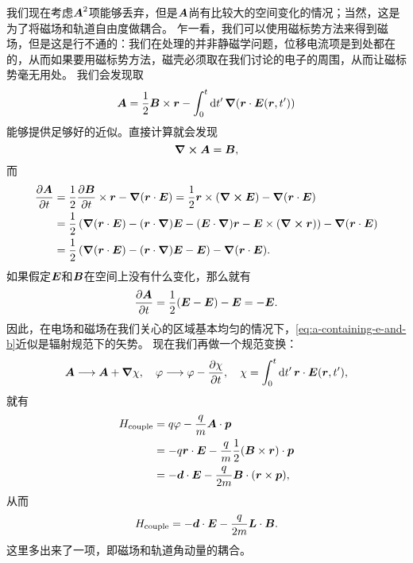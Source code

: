 我们现在考虑$\vb*{A}^2$项能够丢弃，但是$\vb*{A}$尚有比较大的空间变化的情况；当然，这是为了将磁场和轨道自由度做耦合。
乍一看，我们可以使用磁标势方法来得到磁场，但是这是行不通的：我们在处理的并非静磁学问题，位移电流项是到处都在的，从而如果要用磁标势方法，磁壳必须取在我们讨论的电子的周围，从而让磁标势毫无用处。
我们会发现取
\begin{equation}
    \vb*{A} = \frac{1}{2} \vb*{B} \times \vb*{r} - \int_0^t \dd{t'} \grad(\vb*{r} \cdot \vb*{E}(\vb*{r}, t'))
    \label{eq:a-containing-e-and-b}
\end{equation}
能够提供足够好的近似。直接计算就会发现
\[
    \curl{\vb*{A}} = \vb*{B},
\]
而
\[
    \begin{aligned}
        \pdv{\vb*{A}}{t} &= \frac{1}{2} \pdv{\vb*{B}}{t} \times \vb*{r} - \grad{(\vb*{r} \cdot \vb*{E})} = \frac{1}{2} \vb*{r} \times (\curl{\vb*{E}}) - \grad{(\vb*{r} \cdot \vb*{E})} \\
        &= \frac{1}{2} \left( \grad{(\vb*{r} \cdot \vb*{E})} - (\vb*{r} \cdot \grad) \vb*{E} - (\vb*{E} \cdot \grad) \vb*{r} - \vb*{E} \times (\curl{\vb*{r}}) \right) - \grad{(\vb*{r} \cdot \vb*{E})} \\
        &= \frac{1}{2} \left( \grad{(\vb*{r} \cdot \vb*{E})} - (\vb*{r} \cdot \grad) \vb*{E} - \vb*{E} \right)- \grad{(\vb*{r} \cdot \vb*{E})} .
    \end{aligned}
\]
如果假定$\vb*{E}$和$\vb*{B}$在空间上没有什么变化，那么就有
\[
    \pdv{\vb*{A}}{t} = \frac{1}{2} (\vb*{E} - \vb*{E}) - \vb*{E} = - \vb*{E}.
\]
因此，在电场和磁场在我们关心的区域基本均匀的情况下，\eqref{eq:a-containing-e-and-b}近似是辐射规范下的矢势。
现在我们再做一个规范变换：
\[
    \vb*{A} \longrightarrow \vb*{A} + \grad{\chi}, \quad \varphi \longrightarrow \varphi - \pdv{\chi}{t}, \quad \chi = \int_0^t \dd{t'} \vb*{r} \cdot \vb*{E}(\vb*{r}, t'),
\]
就有
\[
    \begin{aligned}
        H_\text{couple} &= q \varphi - \frac{q}{m} \vb*{A} \cdot \vb*{p} \\
        &= - q \vb*{r} \cdot \vb*{E} - \frac{q}{m} \frac{1}{2} (\vb*{B} \times \vb*{r}) \cdot \vb*{p} \\
        &= - \vb*{d} \cdot \vb*{E} - \frac{q}{2m} \vb*{B} \cdot (\vb*{r} \times \vb*{p}),
    \end{aligned}
\]
从而
\begin{equation}
    H_\text{couple} = - \vb*{d} \cdot \vb*{E} - \frac{q}{2m} \vb*{L} \cdot \vb*{B}.
\end{equation}
这里多出来了一项，即磁场和轨道角动量的耦合。

